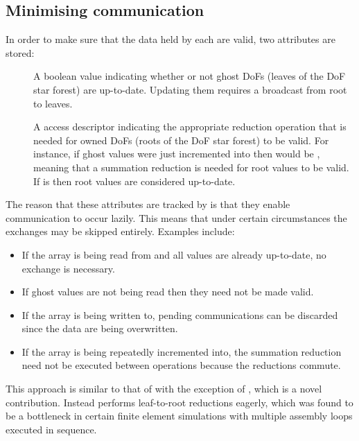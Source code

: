 \documentclass[thesis]{subfiles}
\begin{document}
\subsection{Minimising communication}
\label{sec:parallel_minimising_communication}

In order to make sure that the data held by each  are valid, two attributes are stored:
\begin{description}
  \item[]
    A boolean value indicating whether or not ghost DoFs (leaves of the DoF star forest) are up-to-date.
    Updating them requires a broadcast from root to leaves.

  \item[]
    A  access descriptor indicating the appropriate reduction operation that is needed for owned DoFs (roots of the DoF star forest) to be valid.
    For instance, if ghost values were just incremented into then  would be , meaning that a summation reduction is needed for root values to be valid.
    If  is  then root values are considered up-to-date.
\end{description}

The reason that these attributes are tracked by  is that they enable communication to occur lazily.
This means that under certain circumstances the exchanges may be skipped entirely.
Examples include:
\begin{itemize}
  \item If the array is being read from and all values are already up-to-date, no exchange is necessary.
  \item If ghost values are not being read then they need not be made valid.
  \item If the array is being written to, pending communications can be discarded since the data are being overwritten.
  \item If the array is being repeatedly incremented into, the summation reduction need not be executed between operations because the reductions commute.
\end{itemize}

This approach is similar to that of  with the exception of , which is a novel contribution.
Instead  performs leaf-to-root reductions eagerly, which was found to be a bottleneck in certain finite element simulations with multiple assembly loops executed in sequence.
\end{document}
